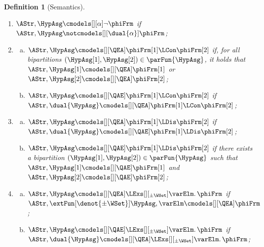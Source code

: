 \documentclass[authoryear]{elsarticle}
\newtheorem{definition}{Definition}
\begin{document}
\begin{definition}[\ADIF Semantics]
\begin{enumerate}[1)]
\begin{enumerate}[a)]
      \end{enumerate}
    \item\label{def:sem(adif:neg)}
      $\AStr, \HypAsg \cmodels[][\alpha] \neg \phiFrm$ if $\AStr, \HypAsg
      \notcmodels[][\dual{\alpha}] \phiFrm$;
    \item\label{def:sem(adif:con)}
      \begin{enumerate}[a)]
        \item\label{def:sem(adif:con:ea)}
          $\AStr, \HypAsg \cmodels[][\QEA] \phiFrm[1] \LCon \phiFrm[2]$ if, for
          all bipartitions $(\HypAsg[1], \HypAsg[2]) \in \parFun{\HypAsg}$, it
          holds that $\AStr, \HypAsg[1] \cmodels[][\QEA] \phiFrm[1]$ or $\AStr,
          \HypAsg[2] \cmodels[][\QEA] \phiFrm[2]$;
        \item\label{def:sem(adif:con:ae)}
          $\AStr, \HypAsg \cmodels[][\QAE] \phiFrm[1] \LCon \phiFrm[2]$ if
          $\AStr, \dual{\HypAsg} \cmodels[][\QEA] \phiFrm[1] \LCon \phiFrm[2]$;
      \end{enumerate}
    \item\label{def:sem(adif:dis)}
      \begin{enumerate}[a)]
        \item\label{def:sem(adif:dis:ea)}
          $\AStr, \HypAsg \cmodels[][\QEA] \phiFrm[1] \LDis \phiFrm[2]$ if
          $\AStr, \dual{\HypAsg} \cmodels[][\QAE] \phiFrm[1] \LDis \phiFrm[2]$;
        \item\label{def:sem(adif:dis:ae)}
          $\AStr, \HypAsg \cmodels[][\QAE] \phiFrm[1] \LDis \phiFrm[2]$ if there
          exists a bipartition $(\HypAsg[1], \HypAsg[2]) \in
          \parFun{\HypAsg}$ such that $\AStr, \HypAsg[1] \cmodels[][\QAE]
          \phiFrm[1]$ and $\AStr, \HypAsg[2] \cmodels[][\QAE] \phiFrm[2]$;
      \end{enumerate}
    \item\label{def:sem(adif:exs)}
      \begin{enumerate}[a)]
        \item\label{def:sem(adif:exs:ea)}
          $\AStr, \HypAsg \cmodels[][\QEA] \LExs[][_{\pm\WSet}] \varElm \ldotp
          \phiFrm$ if $\AStr, \extFun[\denot{\pm\WSet}]{\HypAsg, \varElm}
          \cmodels[][\QEA] \phiFrm$;
        \item\label{def:sem(adif:exs:ae)}
          $\AStr, \HypAsg \cmodels[][\QAE] \LExs[][_{\pm\WSet}] \varElm \ldotp
          \phiFrm$ if $\AStr, \dual{\HypAsg} \cmodels[][\QEA]
          \LExs[][_{\pm\WSet}] \varElm \ldotp \phiFrm$;
      \end{enumerate}

\end{enumerate}
\end{definition}
\end{document}
